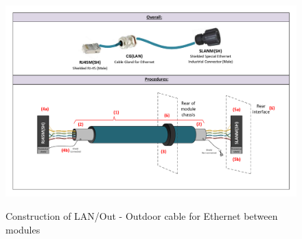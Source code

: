 \begin{figure}
  \centering
  \includegraphics[angle=90,width=1\columnwidth]{figs/body03/FIGLANOutconstruction.pdf}\\
  \caption[Construction of LAN/Out - Outdoor cable for Ethernet between modules]{Construction of LAN/Out - Outdoor cable for Ethernet between modules}
  \label{FIG:LANOutconstruction}
\end{figure}
